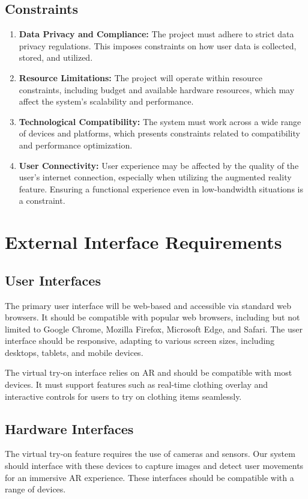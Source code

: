 	\subsection{Constraints}
		\begin{enumerate}
			\item \textbf{Data Privacy and Compliance:} The project must adhere to strict data privacy regulations. This imposes constraints on how user data is collected, stored, and utilized.
			\item \textbf{Resource Limitations:} The project will operate within resource constraints, including budget and available hardware resources, which may affect the system's scalability and performance.
			\item \textbf{Technological Compatibility:} The system must work across a wide range of devices and platforms, which presents constraints related to compatibility and performance optimization.
			\item \textbf{User Connectivity:} User experience may be affected by the quality of the user's internet connection, especially when utilizing the augmented reality feature. Ensuring a functional experience even in low-bandwidth situations is a constraint.
		\end{enumerate}

\section{External Interface Requirements}
	\subsection{User Interfaces}
		The primary user interface will be web-based and accessible via standard web browsers. It should be compatible with popular web browsers, including but not limited to Google Chrome, Mozilla Firefox, Microsoft Edge, and Safari. The user interface should be responsive, adapting to various screen sizes, including desktops, tablets, and mobile devices.

		The virtual try-on interface relies on AR and should be compatible with most devices. It must support features such as real-time clothing overlay and interactive controls for users to try on clothing items seamlessly.
	
	\subsection{Hardware Interfaces}
		The virtual try-on feature requires the use of cameras and sensors. Our system should interface with these devices to capture images and detect user movements for an immersive AR experience. These interfaces should be compatible with a range of devices.


